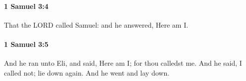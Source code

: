 		\paragraph{1 Samuel 3:4} %
			\label{1SAMUEL-3-4}

			That the LORD called Samuel: and he answered, Here am I.


		\paragraph{1 Samuel 3:5} %
			\label{1SAMUEL-3-5}

			And he ran unto Eli, and said, Here am I; for thou calledst me. And he said, I called not; lie down again. And he went and lay down.


